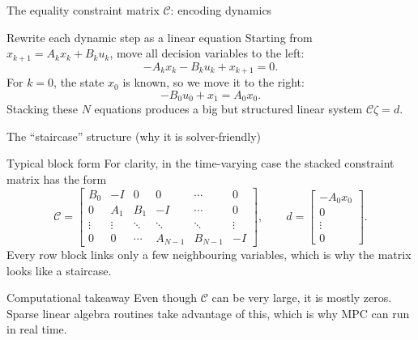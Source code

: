 \documentclass[aspectratio=169,11pt]{beamer}
\begin{document}
\begin{frame}{The equality constraint matrix $\mathcal{C}$: encoding dynamics}
\begin{block}{Rewrite each dynamic step as a linear equation}
Starting from $x_{k+1}=A_k x_k + B_k u_k$, move all decision variables to the left:
\[
-A_k x_k - B_k u_k + x_{k+1} = 0.
\]
For $k=0$, the state $x_0$ is known, so we move it to the right:
\[
-B_0 u_0 + x_1 = A_0 x_0.
\]
Stacking these $N$ equations produces a big but structured linear system $\mathcal{C}\zeta=d$.
\end{block}
\end{frame}

\begin{frame}{The ``staircase'' structure (why it is solver-friendly)}
\begin{block}{Typical block form}
For clarity, in the time-varying case the stacked constraint matrix has the form
\[
\mathcal{C}=
\begin{bmatrix}
 B_0 & -I & 0 & 0 & \cdots & 0\\
 0 & A_1 & B_1 & -I & \cdots & 0\\
 \vdots & \vdots & \ddots & \ddots & \ddots & \vdots\\
 0 & 0 & \cdots & A_{N-1} & B_{N-1} & -I
\end{bmatrix},\qquad
d=\begin{bmatrix}-A_0x_0\\0\\\vdots\\0\end{bmatrix}.
\]
Every row block links only a few neighbouring variables, which is why the matrix looks like a staircase.
\end{block}

\begin{alertblock}{Computational takeaway}
Even though $\mathcal{C}$ can be very large, it is mostly zeros. Sparse linear algebra routines take advantage of this, which is why MPC can run in real time.
\end{alertblock}
\end{frame}
\end{document}
